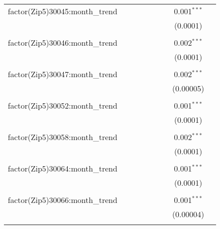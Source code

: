 \begin{table}[H]
{\begin{tabular}{@{\extracolsep{5pt}}lcccccccc}
  factor(Zip5)30045:month\_trend &  &  &  &  &  &  & 0.001$^{***}$ &  \\  

   &  &  &  &  &  &  & (0.0001) &  \\  

   & & & & & & & & \\  

  factor(Zip5)30046:month\_trend &  &  &  &  &  &  & 0.002$^{***}$ &  \\  

   &  &  &  &  &  &  & (0.0001) &  \\  

   & & & & & & & & \\  

  factor(Zip5)30047:month\_trend &  &  &  &  &  &  & 0.002$^{***}$ &  \\  

   &  &  &  &  &  &  & (0.00005) &  \\  

   & & & & & & & & \\  

  factor(Zip5)30052:month\_trend &  &  &  &  &  &  & 0.001$^{***}$ &  \\  

   &  &  &  &  &  &  & (0.0001) &  \\  

   & & & & & & & & \\  

  factor(Zip5)30058:month\_trend &  &  &  &  &  &  & 0.002$^{***}$ &  \\  

   &  &  &  &  &  &  & (0.0001) &  \\  

   & & & & & & & & \\  

  factor(Zip5)30064:month\_trend &  &  &  &  &  &  & 0.001$^{***}$ &  \\  

   &  &  &  &  &  &  & (0.0001) &  \\  

   & & & & & & & & \\  

  factor(Zip5)30066:month\_trend &  &  &  &  &  &  & 0.001$^{***}$ &  \\  

   &  &  &  &  &  &  & (0.00004) &  \\  

   & & & & & & & & \\  


\end{tabular}}
\end{table}
